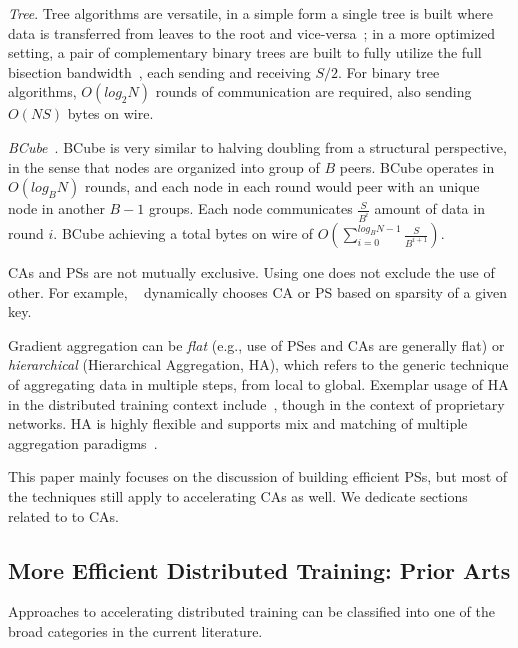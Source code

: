 \noindent\textit{Tree}. Tree algorithms are versatile, in a simple form a single tree is built where data is transferred from leaves to the root and vice-versa~\cite{firecaffe}; in a more optimized setting, a pair of complementary binary trees are built to fully utilize the full bisection bandwidth~\cite{dbt}, each sending and receiving $S/2$. For binary tree \collectives algorithms, $O(log_2N)$ rounds of communication are required, also sending $O(NS)$ bytes on wire. 

\noindent\textit{BCube}~\cite{glooalgo70:online}. BCube is very similar to halving doubling from a structural perspective, in the sense that nodes are organized into group of $B$ peers. BCube operates in $O(log_BN)$ rounds, and each node in each round would peer with an unique node in another $B-1$ groups. Each node communicates $\frac{S}{B^i}$ amount of data in round $i$. BCube achieving a total bytes on wire of $O(\sum_{i=0}^{log_BN-1}\frac{S}{B^{i+1}})$.

CAs and PSs are not mutually exclusive. Using one does not exclude the use of other. For example, ~\cite{10.1145/3302424.3303957} dynamically chooses CA or PS based on sparsity of a given key.

Gradient aggregation can be \textit{flat} (e.g., use of PSes and CAs are generally flat) or \textit{hierarchical} (Hierarchical Aggregation, HA), which refers to the generic technique of aggregating data in multiple steps, from local to global. Exemplar usage of HA in the distributed training context include~\cite{firecaffe,choblueconnect,Geng:2018:HHP:3229543.3229544,sysmlblueconnect}, though in the context of proprietary networks. HA is highly flexible and supports mix and matching of multiple aggregation paradigms~\cite{topoawarempi, cool}.

This paper mainly focuses on the discussion of building efficient PSs, but most of the techniques still apply to accelerating CAs as well. We dedicate sections related to \cmpi to CAs. 

\subsection{More Efficient Distributed Training: Prior Arts}
Approaches to accelerating distributed training can be classified into one of the broad categories in the current literature.

